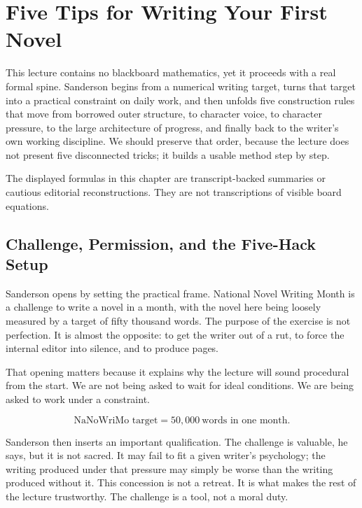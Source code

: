 \chapter{Five Tips for Writing Your First Novel}

This lecture contains no blackboard mathematics, yet it proceeds with a real formal spine. Sanderson begins from a numerical writing target, turns that target into a practical constraint on daily work, and then unfolds five construction rules that move from borrowed outer structure, to character voice, to character pressure, to the large architecture of progress, and finally back to the writer's own working discipline. We should preserve that order, because the lecture does not present five disconnected tricks; it builds a usable method step by step.

\begin{remark}
The displayed formulas in this chapter are transcript-backed summaries or cautious editorial reconstructions. They are not transcriptions of visible board equations.
\end{remark}

\section{Challenge, Permission, and the Five-Hack Setup}

Sanderson opens by setting the practical frame. National Novel Writing Month is a challenge to write a novel in a month, with the novel here being loosely measured by a target of fifty thousand words. The purpose of the exercise is not perfection. It is almost the opposite: to get the writer out of a rut, to force the internal editor into silence, and to produce pages.

That opening matters because it explains why the lecture will sound procedural from the start. We are not being asked to wait for ideal conditions. We are being asked to work under a constraint.

\begin{equation}
\text{NaNoWriMo target}=50{,}000\ \text{words in one month}.
\end{equation}

Sanderson then inserts an important qualification. The challenge is valuable, he says, but it is not sacred. It may fail to fit a given writer's psychology; the writing produced under that pressure may simply be worse than the writing produced without it. This concession is not a retreat. It is what makes the rest of the lecture trustworthy. The challenge is a tool, not a moral duty.

